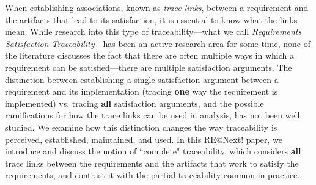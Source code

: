 When establishing associations, known as \emph{ trace links}, between a requirement
and the artifacts that lead to its satisfaction, it is essential to know what the links mean. While research into this type of
traceability---what we call \emph{Requirements Satisfaction Traceability}---has been an active research area for some time, none of the
literature discusses the fact that there are often multiple ways in which a requirement can be satisfied---there are multiple satisfaction arguments.
The distinction between establishing a single satisfaction argument
between a requirement and its implementation (tracing \textbf{one} way the requirement is implemented) vs. tracing \textbf{all} satisfaction arguments, and the possible ramifications for how the trace
links can be used in analysis, has not been well studied.  We examine how this distinction
changes the way traceability is perceived, established, maintained, and used.  In this RE@Next! paper, we introduce
and discuss the notion of ``complete" traceability, which considers \textbf{all} trace
links between the requirements and the artifacts that work to satisfy the
requirements, and contrast it with the partial traceability common in
practice.  